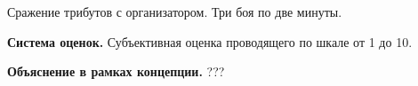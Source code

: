 
\par Сражение трибутов с организатором. Три боя по две минуты.

\par \textbf{Система оценок.} Субъективная оценка проводящего по шкале от 1 до 10.

\par \textbf{Объяснение в рамках концепции.} ???